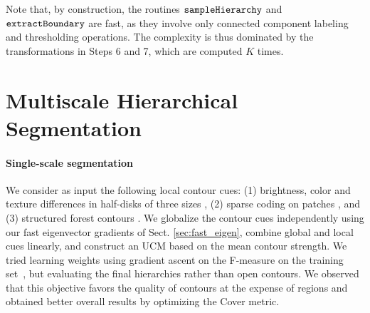 \documentclass[10pt,journal,cspaper,compsoc]{IEEEtran}
\begin{document}
Note that, by construction, the routines ${\tt sampleHierarchy}$ and ${\tt extractBoundary}$ are fast, as they involve only connected component labeling and thresholding operations. 
The complexity is thus dominated by the transformations in Steps 6 and 7, which are computed $K$ times.



\section{Multiscale Hierarchical Segmentation}
\label{sect:multi}

\paragraph*{\textbf{Single-scale segmentation}} 
We consider as input the following local contour cues: (1) brightness, color and texture differences in half-disks of three sizes \cite{Martin-etc:PAMI}, (2) sparse coding on patches \cite{renNIPS12}, and (3) structured forest contours \cite{Dollar:ICCV13}.
We globalize the contour cues independently using our fast eigenvector gradients of Sect. \ref{sec:fast_eigen}, combine global and local cues linearly, and construct an UCM based on the mean contour strength.  
We tried learning weights using gradient ascent on the F-measure on the
training set~\cite{Arbelaez2011}, but evaluating the final hierarchies rather than open contours.
We observed that this objective favors the quality of contours at the expense of regions and obtained better overall results by optimizing the Cover metric.%

\end{document}
